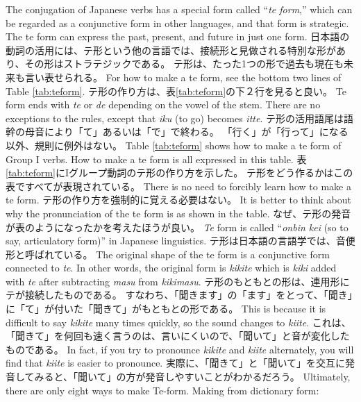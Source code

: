 \documentclass[uplatex,dvipdfmx,b5paper,english,10pt]{jsbook}
\begin{document}
\ifEnglish
The conjugation of Japanese verbs has a special form called ``{\it te form\/},'' which can be regarded as a conjunctive form in other languages, and that form is strategic.
The te form can express the past, present, and future in just one form.
\else
日本語の動詞の活用には、テ形という他の言語では、接続形と見做される特別な形があり、その形はストラテジックである。
テ形は、たった1つの形で過去も現在も未来も言い表せられる。
\fi
\ifEnglish
For how to make a te form, see the bottom two lines of Table \ref{tab:teform}.
\else
テ形の作り方は、表\ref{tab:teform}の下２行を見ると良い。
\fi
\ifEnglish
Te form ends with {\it te\/} or {\it de\/} depending on the vowel of the stem.
There are no exceptions to the rules, except that {\it iku\/} (to go) becomes {\it itte\/}.
\else
テ形の活用語尾は語幹の母音により「て」あるいは「で」で終わる。
「行く」が「行って」になる以外、規則に例外はない。
\fi
\ifEnglish
Table \ref{tab:teform} shows how to make a te form of Group I verbs.
How to make a te form is all expressed in this table.
\else
表\ref{tab:teform}にIグループ動詞のテ形の作り方を示した。
テ形をどう作るかはこの表ですべてが表現されている。
\fi
\ifEnglish
There is no need to forcibly learn how to make a te form.
\else
テ形の作り方を強制的に覚える必要はない。
\fi
\ifEnglish
It is better to think about why the pronunciation of the te form is as shown in the table.
\else
なぜ、テ形の発音が表のようになったかを考えたほうが良い。
\fi
\ifEnglish
{\it Te\/} form is called ``{\it onbin kei\/} (so to say, articulatory form)'' in Japanese linguistics.
\else
テ形は日本語の言語学では、音便形と呼ばれている。
\fi
\ifEnglish
The original shape of the te form is a conjunctive form connected to {\it te\/}.
In other words, the original form is {\it kikite\/} which is {\it kiki\/} added with {\it te\/} after subtracting {\it masu\/} from {\it kikimasu\/}.
\else
テ形のもともとの形は、連用形にテが接続したものである。
すなわち、「聞きます」の「ます」をとって、「聞き」に「て」が付いた「聞きて」がもともとの形である。
\fi
\ifEnglish
This is because it is difficult to say {\it kikite\/} many times quickly, so the sound changes to {\it kiite\/}.
\else
これは、「聞きて」を何回も速く言うのは、言いにくいので、「聞いて」と音が変化したものである。
\fi
\ifEnglish
In fact, if you try to pronounce {\it kikite\/} and {\it kiite\/} alternately, you will find that {\it kiite\/} is easier to pronounce.
\else
実際に、「聞きて」と「聞いて」を交互に発音してみると、「聞いて」の方が発音しやすいことがわかるだろう。
\fi
\ifEnglish
Ultimately, there are only eight ways to make Te-form.
Making from dictionary form:
\end{document}
